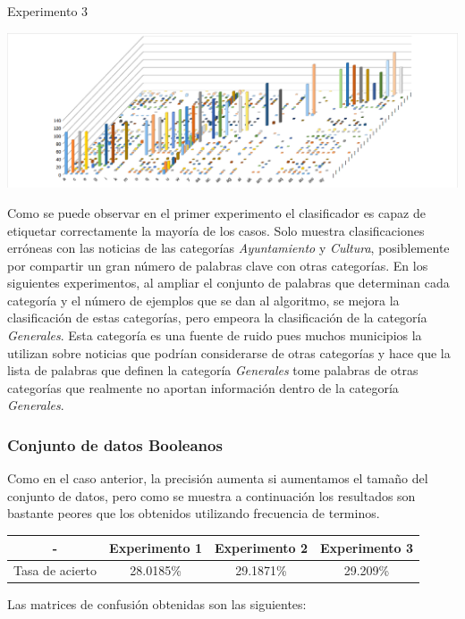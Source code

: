 Experimento 3
\begin{center}
\includegraphics[width=\textwidth]{j48/PART_175_CV15.png} 
\end{center}
Como se puede observar en el primer experimento el clasificador es capaz de etiquetar correctamente la mayoría de los casos. Solo muestra clasificaciones erróneas con las noticias de las categorías \textit{Ayuntamiento} y  \textit{Cultura}, posiblemente por compartir un gran número de palabras clave con otras categorías. En los siguientes experimentos, al ampliar el conjunto de palabras que determinan cada categoría y el número de ejemplos que se dan al algoritmo, se mejora la clasificación de estas categorías, pero empeora la clasificación de la categoría \textit{Generales}. Esta categoría es una fuente de ruido pues muchos municipios la utilizan sobre noticias que podrían considerarse de otras categorías y hace que la lista de palabras que definen la categoría \textit{Generales} tome palabras de otras categorías que realmente no aportan información dentro de la categoría \textit{Generales}.
\subsubsection{Conjunto de datos Booleanos}

Como en el caso anterior, la precisión aumenta si aumentamos el tamaño del conjunto de datos, pero como se muestra a continuación los resultados son bastante peores que los obtenidos utilizando frecuencia de terminos.
\vspace{1em}
\begin{center}
\begin{tabular}{|c|c|c|c|}
\hline 
- & Experimento 1 & Experimento 2 & Experimento 3 \\ 
\hline 
Tasa de acierto & 28.0185\% & 29.1871\% & 29.209\% \\ 
\hline 
\end{tabular} 
\end{center}
\vspace{1em}
Las matrices de confusión obtenidas son las siguientes:

